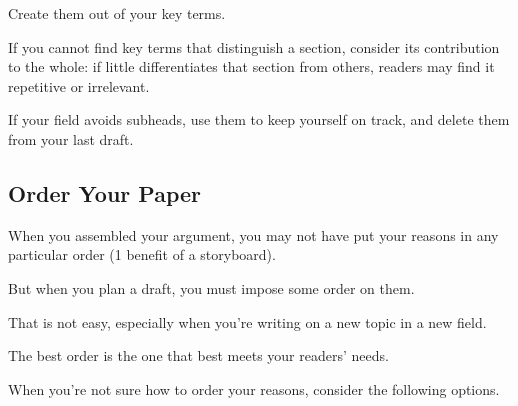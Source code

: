 \documentclass[oneside]{book}
\numberwithin{equation}{section}
\begin{document}
Create them out of your key terms.

If you cannot find key terms that distinguish a section, consider its contribution to the whole: if little differentiates that section from others, readers may find it repetitive or irrelevant.

%
If your field avoids subheads, use them to keep yourself on track, and delete them from your last draft.

\subsection{Order Your Paper}
When you assembled your argument, you may not have put your reasons in any particular order (1 benefit of a storyboard).

But when you plan a draft, you must impose some order on them.

That is not easy, especially when you're writing on a new topic in a new field.

%
The best order is the one that best meets your readers' needs.

When you're not sure how to order your reasons, consider the following options.
\end{document}
